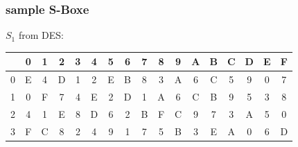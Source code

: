\begin{frame}
\frametitle{sample S-Boxe}
 $S_1$ from DES:
 \begin{tabular}{c|*{16}{c}}
    &  0 &  1 &  2 &  3 &  4 &  5 &  6 &  7 &  8 &  9 &  A &  B &  C &  D &  E &  F \\ \hline
  0 &  E &  4 &  D &  1 &  2 &  E &  B &  8 &  3 &  A &  6 &  C &  5 &  9 &  0 &  7 \\
  1 &  0 &  F &  7 &  4 &  E &  2 &  D &  1 &  A &  6 &  C &  B &  9 &  5 &  3 &  8 \\
  2 &  4 &  1 &  E &  8 &  D &  6 &  2 &  B &  F &  C &  9 &  7 &  3 &  A &  5 &  0 \\
  3 &  F &  C &  8 &  2 &  4 &  9 &  1 &  7 &  5 &  B &  3 &  E &  A &  0 &  6 &  D \\
 \end{tabular}
\end{frame}